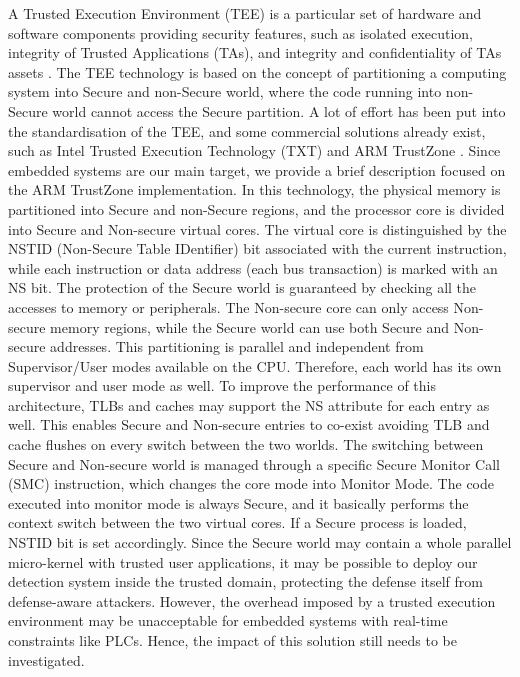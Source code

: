 A Trusted Execution Environment (TEE) is a particular set of hardware and software components providing security features,
such as isolated execution, integrity of Trusted Applications (TAs), and integrity and confidentiality of TAs assets \cite{tee}.
The TEE technology is based on the concept of partitioning a computing system into Secure and non-Secure world, where
the code running into non-Secure world cannot access the Secure partition.
A lot of effort has been put into the standardisation of the TEE, and some commercial solutions already exist,
such as Intel Trusted Execution Technology (TXT) \cite{intel-txt} and ARM TrustZone \cite{trustzone}.
Since embedded systems are our main target, we provide a brief description focused on the ARM TrustZone implementation.
In this technology, the physical memory is partitioned into Secure and non-Secure regions, and the processor core is divided into Secure and Non-secure virtual cores.
The virtual core is distinguished by the NSTID (Non-Secure Table IDentifier) bit associated with the current instruction,
while each instruction or data address (\ie each bus transaction) is marked with an NS bit.
The protection of the Secure world is guaranteed by checking all the accesses to memory or peripherals.
The Non-secure core can only access Non-secure memory regions, while the Secure world can use both Secure and Non-secure addresses.
This partitioning is parallel and independent from Supervisor/User modes available on the CPU. Therefore, each world has its own supervisor and user mode as well.
To improve the performance of this architecture, TLBs and caches may support the NS attribute for each entry as well.
This enables Secure and Non-secure entries to co-exist avoiding TLB and cache flushes on every switch between the two worlds.
The switching between Secure and Non-secure world is managed through a specific Secure Monitor Call (SMC) instruction,
which changes the core mode into Monitor Mode. The code executed into monitor mode is always Secure, and it basically performs the context switch
between the two virtual cores. If a Secure process is loaded, NSTID bit is set accordingly.
Since the Secure world may contain a whole parallel micro-kernel with trusted user applications, it may be possible
to deploy our detection system inside the trusted domain, protecting the defense itself from defense-aware attackers.
However, the overhead imposed by a trusted execution environment may be unacceptable for embedded systems with real-time constraints like PLCs.
Hence, the impact of this solution still needs to be investigated.


